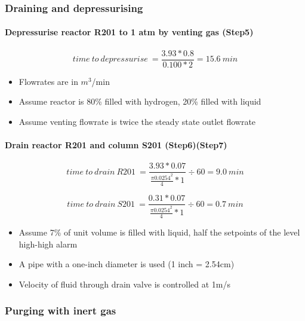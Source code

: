 \subsubsection{Draining and depressurising}   
\paragraph{Depressurise reactor R201 to 1 atm by venting gas (Step5)}
    \begin{equation}
        time\:to\:depressurise\:=\frac{3.93 * 0.8}{0.100 * 2}=15.6\:min
    \end{equation}
    
    \begin{itemize}
        \item Flowrates are in $m^3$/min
        \item Assume reactor is 80\% filled with hydrogen, 20\% filled with liquid
        \item Assume venting flowrate is twice the steady state outlet flowrate
    \end{itemize}
    
\paragraph{Drain reactor R201 and column S201 (Step6)(Step7)}   

    \begin{equation}
        time\:to\:drain\:R201\:=\frac{3.93 * 0.07}{\frac{\pi 0.0254^2}{4} * 1} \div 60 =9.0\:min
    \end{equation}
    
    \begin{equation}
        time\:to\:drain\:S201\:=\frac{0.31 * 0.07}{\frac{\pi 0.0254^2}{4} * 1} \div 60 =0.7\:min
    \end{equation}
    
    \begin{itemize}
        \item Assume 7\% of unit volume is filled with liquid, half the setpoints of the level high-high alarm
        \item A pipe with a one-inch diameter is used (1 inch = 2.54cm)
        \item Velocity of fluid through drain valve is controlled at 1m/s
    \end{itemize}

\subsubsection{Purging with inert gas} 
